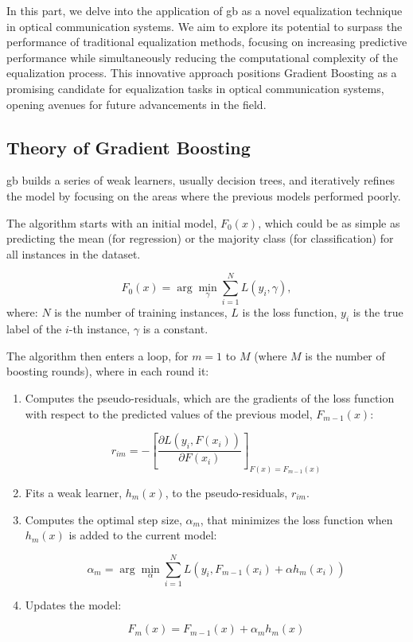 In this part, we delve into the application of
\acrshort{gb}
as a novel equalization technique in optical communication systems. We aim to explore its potential to surpass the performance of traditional equalization methods, focusing on increasing predictive performance while simultaneously reducing the computational complexity of the equalization process. This innovative approach positions Gradient Boosting as a promising candidate for equalization tasks in optical communication systems, opening avenues for future advancements in the field.

\subsection{Theory of Gradient Boosting}

\acrfull{gb} builds a series of weak learners, usually decision trees, and iteratively refines the model by focusing on the areas where the previous models performed poorly. 

The algorithm starts with an initial model, \( F_0(x) \), which could be as simple as predicting the mean (for regression) or the majority class (for classification) for all instances in the dataset.

\begin{equation}
    F_0(x) = \arg\min_{\gamma} \sum_{i=1}^N L(y_i, \gamma) {,}
\end{equation}
where: \( N \) is the number of training instances,
\( L \) is the loss function,
\( y_i \) is the true label of the \( i \)-th instance,
\( \gamma \) is a constant.


The algorithm then enters a loop, for \( m = 1 \) to \( M \) (where \( M \) is the number of boosting rounds), where in each round it:
\begin{enumerate}
    \item Computes the pseudo-residuals, which are the gradients of the loss function with respect to the predicted values of the previous model, \( F_{m-1}(x) \):

\begin{equation}
r_{im} = -\left[\frac{\partial L(y_i, F(x_i))}{\partial F(x_i)}\right]_{F(x)=F_{m-1}(x)}
\end{equation}

    \item Fits a weak learner, \( h_m(x) \), to the pseudo-residuals, \( r_{im} \).

    \item Computes the optimal step size, \( \alpha_m \), that minimizes the loss function when \( h_m(x) \) is added to the current model:

\begin{equation}
\alpha_m = \arg\min_{\alpha} \sum_{i=1}^N L(y_i, F_{m-1}(x_i) + \alpha h_m(x_i))
\end{equation}

    \item Updates the model:

\begin{equation}
F_m(x) = F_{m-1}(x) + \alpha_m h_m(x)
\end{equation}

\end{enumerate}

